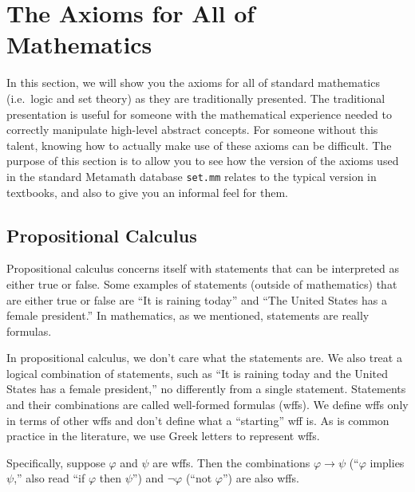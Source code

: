 \section{The Axioms for All of Mathematics}

In this section, we will show you the axioms
for all of standard mathematics (i.e.\ logic and set theory) as they are
traditionally presented.  The traditional presentation is useful for someone
with the mathematical experience needed to correctly manipulate high-level
abstract concepts.  For someone without this talent, knowing how to actually
make use of these axioms can be difficult.  The purpose of this section is to
allow you to see how the version of the axioms used in the standard
Metamath database \texttt{set.mm} relates to  the typical version
in textbooks, and also to give you an informal feel for them.

\subsection{Propositional Calculus}

Propositional calculus concerns itself with
statements that can be interpreted as either true or false.  Some examples of
statements (outside of mathematics) that are either true or false are ``It is
raining today'' and ``The United States has a female president.'' In
mathematics, as we mentioned, statements are really formulas.

In propositional calculus, we don't care what the statements are.  We also
treat a logical combination of statements, such as ``It is raining today and
the United States has a female president,'' no differently from a single
statement.  Statements and their combinations are called well-formed formulas
(wffs).  We define wffs only in terms of
other wffs and don't define what a ``starting'' wff is.  As is common practice
in the literature, we use Greek letters to represent wffs.

Specifically, suppose $\varphi$ and $\psi$ are wffs.  Then the combinations
$\varphi\rightarrow\psi$ (``$\varphi$ implies $\psi$,'' also read ``if
$\varphi$ then $\psi$'') and $\lnot\varphi$
(``not $\varphi$'') are also wffs.

